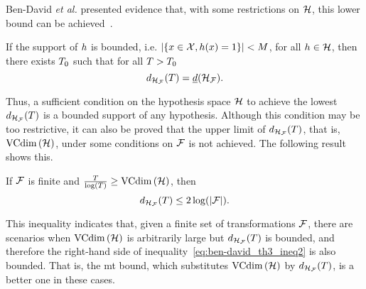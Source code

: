 Ben-David \emph{et al.} presented evidence that, with some restrictions on $\mathcal{H}$, this lower bound can be achieved~\cite[Theorem~4]{Ben-DavidB08}.
\begin{theorem}
    If the support of $h$ is bounded, i.e. $ \left|\left\{x \in \mathcal{X},  h(x) = 1\right\}\right| < M$, for all $h \in \mathcal{H}$, then there exists $T_0$ such that for all $T>T_0$
    \begin{equation}
        \nonumber
        d_{\mathcal{H}_{\mathcal{F}}}(T) = \underline{d}(\mathcal{H}_{\mathcal{F}}).
    \end{equation} 
\end{theorem}
Thus, a sufficient condition on the hypothesis space $\mathcal{H}$ to achieve the lowest $d_{\mathcal{H}_{\mathcal{F}}}(T)$ is a bounded support of any hypothesis. Although this condition may be too restrictive, it can also be proved that the upper limit of $d_{\mathcal{H}_{\mathcal{F}}}(T)$, that is, $\operatorname{VCdim}\left(\mathcal{H}\right)$, under some conditions on $\mathcal{F}$ is not achieved. 
%
The following result~\cite[Theorem~6]{Ben-DavidB08} shows this.
\begin{theorem}\label{th:ben-david_th6}
    If $\mathcal{F}$ is finite and $\frac{T}{\log (T)} \geq \operatorname{VCdim}\left(\mathcal{H}\right)$, then
    \begin{equation}
        \nonumber
        d_{\mathcal{H}_{\mathcal{F}}}(T) \leq 2 \log(\left|\mathcal{F}\right|) .
    \end{equation}
\end{theorem}
This inequality indicates that, given a finite set of transformations $\mathcal{F}$, there are scenarios when $\operatorname{VCdim}\left(\mathcal{H}\right)$ is arbitrarily large but $d_{\mathcal{H}_{\mathcal{F}}}(T)$ is bounded, and therefore the right-hand side of inequality~\eqref{eq:ben-david_th3_ineq2} is also bounded. That is, the \acrshort{mt} bound, which substitutes $\operatorname{VCdim}\left(\mathcal{H}\right)$ by $d_{\mathcal{H}_{\mathcal{F}}}(T)$, is a better one in these cases. 



